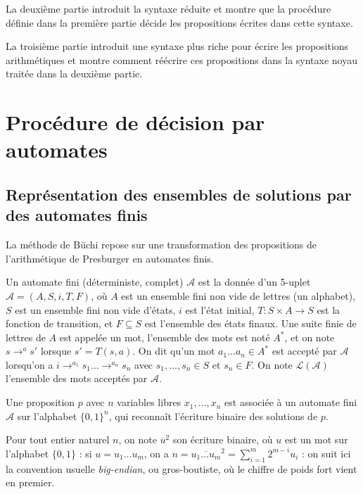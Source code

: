 \documentclass{article}
\begin{document}
\vspace{0.5em}

La deuxième partie introduit la syntaxe réduite et montre que la
procédure définie dans la première partie décide les propositions
écrites dans cette syntaxe.

La troisième partie introduit une syntaxe plus riche pour écrire les
propositions arithmétiques et montre comment réécrire ces propositions
dans la syntaxe noyau traitée dans la deuxième partie.

\section{Procédure de décision par automates}

\subsection{Représentation des ensembles de solutions par des automates finis}

La méthode de Büchi repose sur une transformation des propositions de
l'arithmétique de Presburger en automates finis.

Un automate fini (déterministe, complet) \(\mathcal A\) est la donnée d'un 5-uplet
\(\mathcal A = (A, S, i, T, F)\), où \(A\) est un ensemble fini non vide de lettres
(un alphabet), \(S\) est un ensemble fini non vide d'états, \(i\) est
l'état initial, \(T : S \times A \rightarrow S\) est la fonction de
transition, et \(F \subseteq S\) est l'ensemble des états finaux.
Une suite finie de lettres de \(A\) est appelée un mot, l'ensemble des mots est noté \(A^*\),
et on note \(s \rightarrow^a s'\) lorsque \(s' = T(s, a)\).
On dit qu'un mot \(a_1 \dots a_n \in A^*\) est accepté par \(\mathcal A\) lorsqu'on a
\(i \rightarrow^{a_1} s_1 \dots \rightarrow^{a_n} s_n\)
avec \(s_1, \dots, s_n \in S\) et \(s_n \in F\).
On note \(\mathcal L(\mathcal A)\) l'ensemble des mots acceptés par \(\mathcal A\).

Une proposition \(p\) avec \(n\) variables libres \(x_1, \dots, x_n\) est
associée à un automate fini \(\mathcal A\) sur l'alphabet \(\{0,1\}^n\),
qui reconnaît l'écriture binaire des solutions de \(p\).

Pour tout entier naturel \(n\), on note \(\overline{u}^2\) son
écriture binaire, où \(u\) est un mot sur l'alphabet \(\{0,1\}\) : si
\(u = u_1 \dots u_m\), on a
\(n = \overline{u_1 \dots u_m}^2 = \sum_{i=1}^m 2^{m-i}u_i\) : on suit
ici la convention usuelle \emph{big-endian}, ou gros-boutiste, où le
chiffre de poids fort vient en premier.
\end{document}
